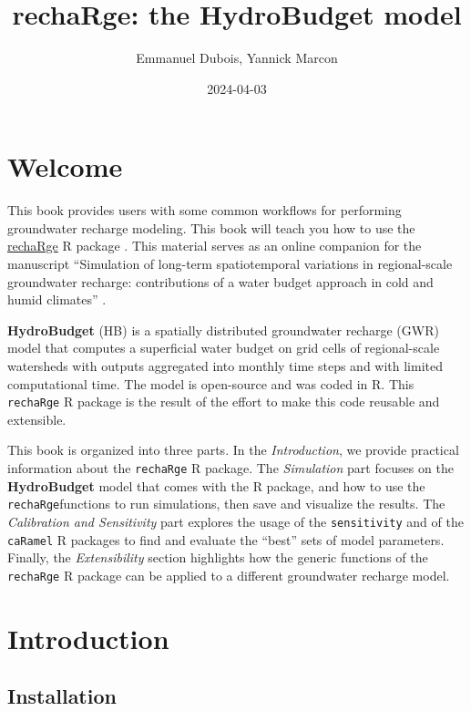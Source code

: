 \documentclass[
]{book}
\title{rechaRge: the HydroBudget model}
\author{Emmanuel Dubois, Yannick Marcon}
\date{2024-04-03}
\begin{document}
\maketitle

{
\setcounter{tocdepth}{1}
\tableofcontents
}
\hypertarget{welcome}{%
\chapter*{Welcome}\label{welcome}}

This book provides users with some common workflows for performing groundwater recharge modeling. This book will teach you how to use the \href{https://github.com/gwrecharge/rechaRge}{rechaRge} R package \citep{R-rechaRge}. This material serves as an online companion for the manuscript ``Simulation of long-term spatiotemporal variations in regional-scale groundwater recharge: contributions of a water budget approach in cold and humid climates'' \citep{hess-25-6567-2021}.

\textbf{HydroBudget} (HB) is a spatially distributed groundwater recharge (GWR) model that computes a superficial water budget on grid cells of regional-scale watersheds with outputs aggregated into monthly time steps and with limited computational time. The model is open-source and was coded in R. This \texttt{rechaRge} R package is the result of the effort to make this code reusable and extensible.

This book is organized into three parts. In the \emph{Introduction}, we provide practical information about the \texttt{rechaRge} R package. The \emph{Simulation} part focuses on the \textbf{HydroBudget} model that comes with the R package, and how to use the \texttt{rechaRge}functions to run simulations, then save and visualize the results. The \emph{Calibration and Sensitivity} part explores the usage of the \texttt{sensitivity} and of the \texttt{caRamel} R packages to find and evaluate the ``best'' sets of model parameters. Finally, the \emph{Extensibility} section highlights how the generic functions of the \texttt{rechaRge} R package can be applied to a different groundwater recharge model.

\hypertarget{intro}{%
\chapter{Introduction}\label{intro}}

\hypertarget{installation}{%
\section{Installation}\label{installation}}
\end{document}
